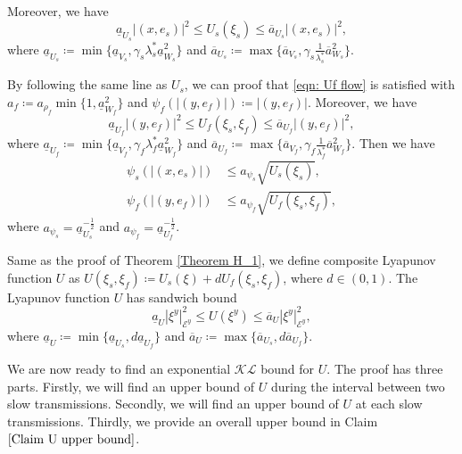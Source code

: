 Moreover, we have $$\underline{a}_{U_s}|(x,e_s)|^2 \leq U_s(\xi_s) \leq \overline{a}_{U_s}|(x,e_s)|^2,$$ where $\underline{a}_{U_s} \coloneqq \min\{\underline{a}_{V_s}, \gamma_s \lambda_s^* \underline{a}_{W_s}^2 \}$ and $\overline{a}_{U_s} \coloneqq \max\{\overline{a}_{V_s}, \gamma_s \tfrac{1}{\lambda_s^*} \overline{a}_{W_s}^2 \}$.

By following the same line as $U_s$, we can proof that \eqref{eqn: Uf flow} is satisfied with $a_f \coloneqq a_{\rho_f} \min \{ 1, \underline{a}_{W_f}^2 \}$ and $\psi_f(|(y,e_f)|) \coloneqq |(y,e_f)|$. Moreover, we have $$\underline{a}_{U_f}|(y,e_f)|^2 \leq U_f(\xi_s, \xi_f) \leq \overline{a}_{U_f}|(y,e_f)|^2,$$ where $\underline{a}_{U_f} \coloneqq \min\{\underline{a}_{V_f}, \gamma_f \lambda_f^* \underline{a}_{W_f}^2 \}$ and $\overline{a}_{U_f} \coloneqq \max\{\overline{a}_{V_f}, \gamma_f \tfrac{1}{\lambda_f^*} \overline{a}_{W_f}^2 \}$. Then we have 
\begin{equation}
\begin{aligned}
    \psi_s(|(x,e_s)|) &\leq a_{\psi_s}\sqrt{U_s(\xi_s)}, \\
    \psi_f(|(y,e_f)|) &\leq a_{\psi_f}\sqrt{U_f(\xi_s,\xi_f)} ,
\end{aligned}
\label{eqn: upper bound of psi}
\end{equation}
where $a_{\psi_s} = \underline{a}_{U_s}^{-\frac{1}{2}}$ and $a_{\psi_f} = \underline{a}_{U_f}^{-\frac{1}{2}}$.






Same as the proof of Theorem \ref{Theorem H_1}, we define composite Lyapunov function $U$ as $U(\xi_s, \xi_f) \coloneqq U_s(\xi) + d U_f(\xi_s,\xi_f)$, where $d \in (0,1)$. The Lyapunov function $U$ has sandwich bound 
\begin{equation}
    \underline{a}_{U} |\xi^y|_{\mathcal{E}^y}^2 \leq U(\xi^y) \leq \overline{a}_{U} |\xi^y|_{\mathcal{E}^y}^2, \label{eqn: Exponential U sandwich bound}
\end{equation}
where $\underline{a}_{U} \coloneqq \min \{\underline{a}_{U_s}, d \underline{a}_{U_f} \}$ and $\overline{a}_{U} \coloneqq \max \{\overline{a}_{U_s}, d \overline{a}_{U_f} \}$. 


We are now ready to find an exponential $\mathcal{KL}$ bound for $U$. The proof has three parts. Firstly, we will find an upper bound of $U$ during the interval between two slow transmissions. Secondly, we will find an upper bound of $U$ at each slow transmissions. Thirdly, we provide an overall upper bound in Claim $\ref{Claim U upper bound}$.



